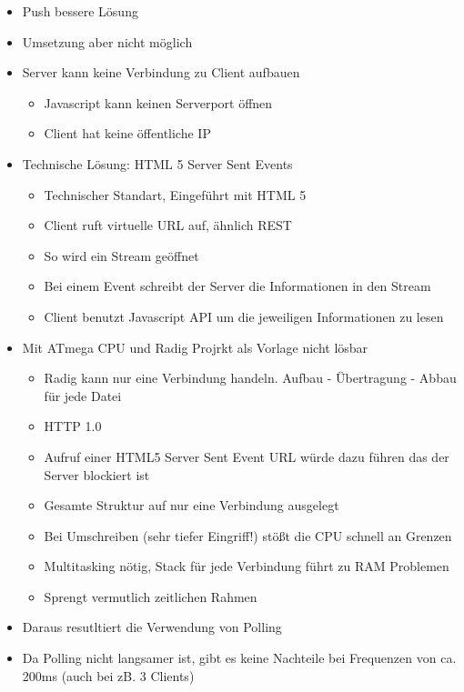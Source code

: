 \begin{itemize}
	\item Push bessere Lösung
	\item Umsetzung aber nicht möglich
	\item Server kann keine Verbindung zu Client aufbauen
	\begin{itemize}
		\item Javascript kann keinen Serverport öffnen
		\item Client hat keine öffentliche IP
	\end{itemize}
	\item Technische Lösung: HTML 5 Server Sent Events
	\begin{itemize}
		\item Technischer Standart, Eingeführt mit HTML 5
		\item Client ruft virtuelle URL auf, ähnlich REST
		\item So wird ein Stream geöffnet
		\item Bei einem Event schreibt der Server die Informationen in den Stream
		\item Client benutzt Javascript API um die jeweiligen Informationen zu lesen
	\end{itemize}
	\item Mit ATmega CPU und Radig Projrkt als Vorlage nicht lösbar
	\begin{itemize}
		\item Radig kann nur eine Verbindung handeln. Aufbau - Übertragung - Abbau für 
			  jede Datei
		\item HTTP 1.0
		\item Aufruf einer HTML5 Server Sent Event URL würde dazu führen das der Server 
			  blockiert ist
		\item Gesamte Struktur auf nur eine Verbindung ausgelegt
		\item Bei Umschreiben (sehr tiefer Eingriff!) stößt die CPU schnell an Grenzen
		\item Multitasking nötig, Stack für jede Verbindung führt zu RAM Problemen
		\item Sprengt vermutlich zeitlichen Rahmen
	\end{itemize}
	\item Daraus resutltiert die Verwendung von Polling
	\item Da Polling nicht langsamer ist, gibt es keine Nachteile bei Frequenzen von ca. 
		  200ms (auch bei zB. 3 Clients)
\end{itemize}

